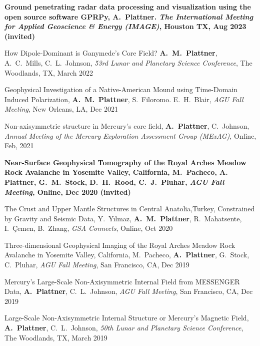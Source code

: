 \documentclass[10pt]{article}
\begin{document}
\spcp
\textbf{Ground penetrating radar data processing and visualization using the open source software GPRPy, A.~Plattner. \emph{The International Meeting for
Applied Geoscience \& Energy (IMAGE)}, Houston TX, Aug 2023 (invited)}

\spcp
\hspace{-0.4cm} \gr \hspace{-0.03cm} How Dipole-Dominant is Ganymede’s Core Field? \textbf{A.~M.~Plattner}, A.~C.~Mills, C.~L.~Johnson, \emph{53rd Lunar and Planetary Science Conference},
The Woodlands, TX, March 2022


\spcp
Geophysical Investigation of a Native-American Mound using Time-Domain Induced Polarization, \textbf{A.~M.~Plattner}, S.~Filoromo. E.~H.~Blair, \emph{AGU Fall Meeting}, New Orleans, LA, Dec 2021


\spcp
Non-axisymmetric structure in Mercury's core field, \textbf{A.~Plattner}, C.~Johnson, \emph{Annual Meeting of the Mercury Exploration Assessment Group (MExAG)}, Online, Feb, 2021

\spcp
\hspace{-0.4cm} \gr \hspace{-0.03cm} \textbf{Near-Surface Geophysical Tomography of the Royal Arches Meadow Rock Avalanche in Yosemite Valley, California, M.~Pacheco, {\normalfont A. Plattner}, G.~M.~Stock, D.~H.~Rood, C.~J.~Pluhar, \emph{AGU Fall Meeting}, Online, Dec 2020 (invited)}

\spcp
\hspace{-0.4cm} \gr \hspace{-0.03cm} The Crust and Upper Mantle Structures in Central Anatolia,Turkey, Constrained by Gravity and Seismic Data, Y.~Y\i lmaz, \textbf{A.~M.~Plattner}, R.~Mahatsente, I.~\c Cemen, B.~Zhang, \emph{GSA Connects}, Online, Oct 2020

\spcp
\hspace{-0.4cm} \gr \hspace{-0.03cm} Three-dimensional Geophysical Imaging of the Royal Arches Meadow Rock Avalanche in Yosemite Valley, California, M.~Pacheco, \textbf{A.~Plattner}, G.~Stock, C.~Pluhar, \emph{AGU Fall Meeting}, San Francisco, CA, Dec 2019

\spcp
Mercury's Large-Scale Non-Axisymmetric Internal Field from MESSENGER Data, \textbf{A.~Plattner}, C.~L.~Johnson, \emph{AGU Fall Meeting}, San Francisco, CA, Dec 2019

\spcp
Large-Scale Non-Axisymmetric Internal Structure or Mercury's Magnetic Field,
\textbf{A.~Plattner}, C.~L.~Johnson, \emph{50th Lunar and Planetary Science Conference},
The Woodlands, TX, March 2019
\end{document}
